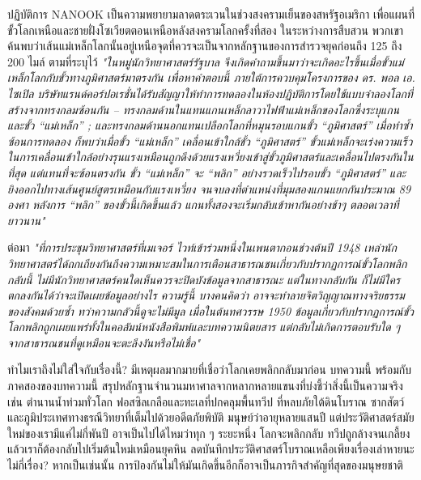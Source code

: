 \documentclass[10pt,twocolumn,letterpaper]{article}
\begin{document}
ปฏิบัติการ NANOOK เป็นความพยายามลาดตระเวนในช่วงสงครามเย็นของสหรัฐอเมริกา เพื่อแผนที่ขั้วโลกเหนือและชายฝั่งโซเวียตตอนเหนือหลังสงครามโลกครั้งที่สอง \cite{137} ในระหว่างการสืบสวน พวกเขาค้นพบว่าเส้นแม่เหล็กโลกนั้นอยู่เหนือจุดที่ควรจะเป็นจากหลักฐานของการสำรวจยุคก่อนถึง 125 ถึง 200 ไมล์ ตามที่ระบุไว้ \textit{"ในหมู่นักวิทยาศาสตร์รัฐบาล จึงเกิดคำถามขึ้นมาว่าจะเกิดอะไรขึ้นเมื่อขั้วแม่เหล็กโลกกับขั้วทางภูมิศาสตร์มาตรงกัน เพื่อหาคำตอบนี้ ภายใต้การควบคุมโครงการของ ดร. พอล เอ. ไซเปิล บริษัทแรนด์คอร์ปอเรชั่นได้รับสัญญาให้ทำการทดลองในห้องปฏิบัติการโดยใช้แบบจำลองโลกที่สร้างจากทรงกลมซ้อนกัน – ทรงกลมด้านในแทนแกนเหล็กลาวาไฟฟ้าแม่เหล็กของโลกซึ่งระบุแกนและขั้ว “แม่เหล็ก” ; และทรงกลมด้านนอกแทนเปลือกโลกที่หมุนรอบแกนขั้ว “ภูมิศาสตร์” เมื่อทำซ้ำซ้อนการทดลอง ก็พบว่าเมื่อขั้ว “แม่เหล็ก” เคลื่อนเข้าใกล้ขั้ว “ภูมิศาสตร์” ขั้วแม่เหล็กจะเร่งความเร็วในการเคลื่อนเข้าใกล้อย่างรุนแรงเหมือนถูกดึงด้วยแรงเหวี่ยงเข้าสู่ขั้วภูมิศาสตร์และเคลื่อนไปตรงกันในที่สุด แต่แทนที่จะซ้อนตรงกัน ขั้ว “แม่เหล็ก” จะ “พลิก” อย่างรวดเร็วไปรอบขั้ว “ภูมิศาสตร์” และยิงออกไปทางเส้นศูนย์สูตรเหมือนกับแรงเหวี่ยง จนจบลงที่ตำแหน่งที่มุมสองแกนแยกกันประมาณ 89 องศา หลังการ “พลิก” ของขั้วนี้เกิดขึ้นแล้ว แกนทั้งสองจะเริ่มกลับเข้าหากันอย่างช้าๆ ตลอดเวลาที่ยาวนาน"} \cite{138,139}

ต่อมา \textit{"ที่การประชุมวิทยาศาสตร์ที่เมเจอร์ ไวท์เข้าร่วมหนึ่งในเพนตากอนช่วงต้นปี 1948 เหล่านักวิทยาศาสตร์ได้ถกเถียงกันถึงความเหมาะสมในการเตือนสาธารณชนเกี่ยวกับปรากฏการณ์ขั้วโลกพลิกกลับนี้ ไม่มีนักวิทยาศาสตร์คนใดเห็นควรจะปิดบังข้อมูลจากสาธารณะ แต่ในทางกลับกัน ก็ไม่มีใครตกลงกันได้ว่าจะเปิดเผยข้อมูลอย่างไร ความรู้นี้ บางคนคิดว่า อาจจะทำลายจิตวิญญาณทางจริยธรรมของสังคมด้วยซ้ำ ทว่าความกลัวนี้ดูจะไม่มีมูล เมื่อในต้นทศวรรษ 1950 ข้อมูลเกี่ยวกับปรากฏการณ์ขั้วโลกพลิกถูกเผยแพร่ทั้งในคอลัมน์หนังสือพิมพ์และบทความนิตยสาร แต่กลับไม่เกิดการตอบรับใด ๆ จากสาธารณชนที่ดูเหมือนจะตะลึงงันหรือไม่เชื่อ"} \cite{138,139}

ทำไมเราถึงไม่ใส่ใจกับเรื่องนี้? มีเหตุผลมากมายที่เชื่อว่าโลกเคยพลิกกลับมาก่อน บทความนี้ พร้อมกับภาคสองของบทความนี้ สรุปหลักฐานจำนวนมหาศาลจากหลากหลายแขนงที่บ่งชี้ว่าสิ่งนี้เป็นความจริง เช่น ตำนานน้ำท่วมทั่วโลก ฟอสซิลเกลือและทะเลที่ปกคลุมพื้นทวีป ที่หลบภัยใต้ดินโบราณ ซากสัตว์ และภูมิประเทศทางธรณีวิทยาที่เต็มไปด้วยอดีตภัยพิบัติ มนุษย์ว่าอายุหลายแสนปี แต่ประวัติศาสตร์สมัยใหม่ของเรามีแค่ไม่กี่พันปี อาจเป็นไปได้ไหมว่าทุก ๆ ระยะหนึ่ง โลกจะพลิกกลับ ทวีปถูกล้างจนเกลี้ยง แล้วเราก็ต้องกลับไปเริ่มต้นใหม่เหมือนยุคหิน ลดบันทึกประวัติศาสตร์โบราณเหลือเพียงเรื่องเล่าหายนะไม่กี่เรื่อง? หากเป็นเช่นนั้น การป้องกันไม่ให้มันเกิดขึ้นอีกก็อาจเป็นภารกิจสำคัญที่สุดของมนุษยชาติ
\end{document}
